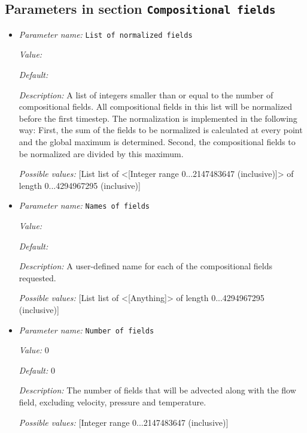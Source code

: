 \subsection{Parameters in section \tt Compositional fields}
\label{parameters:Compositional_20fields}

\begin{itemize}
\item {\it Parameter name:} {\tt List of normalized fields}
\label{parameters:Compositional fields/List of normalized fields}


{\it Value:} 


{\it Default:} 


{\it Description:} A list of integers smaller than or equal to the number of compositional fields. All compositional fields in this list will be normalized before the first timestep. The normalization is implemented in the following way: First, the sum of the fields to be normalized is calculated at every point and the global maximum is determined. Second, the compositional fields to be normalized are divided by this maximum.


{\it Possible values:} [List list of <[Integer range 0...2147483647 (inclusive)]> of length 0...4294967295 (inclusive)]
\item {\it Parameter name:} {\tt Names of fields}
\label{parameters:Compositional fields/Names of fields}


{\it Value:} 


{\it Default:} 


{\it Description:} A user-defined name for each of the compositional fields requested.


{\it Possible values:} [List list of <[Anything]> of length 0...4294967295 (inclusive)]
\item {\it Parameter name:} {\tt Number of fields}
\label{parameters:Compositional fields/Number of fields}


{\it Value:} 0


{\it Default:} 0


{\it Description:} The number of fields that will be advected along with the flow field, excluding velocity, pressure and temperature.


{\it Possible values:} [Integer range 0...2147483647 (inclusive)]
\end{itemize}

